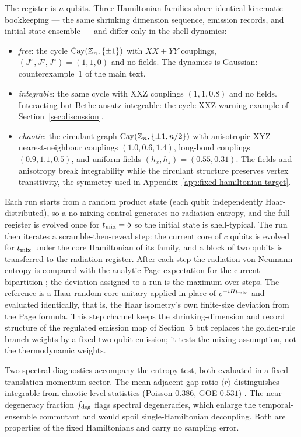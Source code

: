 \documentclass[12pt]{article}
\begin{document}
The register is $n$ qubits.  Three Hamiltonian families share identical
kinematic bookkeeping --- the same shrinking dimension sequence, emission
records, and initial-state ensemble --- and differ only in the shell
dynamics:
\begin{itemize}
\item
\emph{free}: the cycle ${\rm Cay}(\mathbb Z_n,\{\pm1\})$ with $XX+YY$
couplings, $(J^x,J^y,J^z)=(1,1,0)$ and no fields.  The dynamics is Gaussian:
counterexample~1 of the main text.
\item
\emph{integrable}: the same cycle with XXZ couplings $(1,1,0.8)$ and no
fields.  Interacting but Bethe-ansatz integrable: the cycle-XXZ warning
example of Section~\ref{sec:discussion}.
\item
\emph{chaotic}: the circulant graph ${\rm Cay}(\mathbb Z_n,\{\pm1,n/2\})$
with anisotropic XYZ nearest-neighbour couplings $(1.0,0.6,1.4)$, long-bond
couplings $(0.9,1.1,0.5)$, and uniform fields $(h_x,h_z)=(0.55,0.31)$.  The
fields and anisotropy break integrability while the circulant structure
preserves vertex transitivity, the symmetry used in
Appendix~\ref{app:fixed-hamiltonian-target}.
\end{itemize}
Each run starts from a random product state (each qubit independently
Haar-distributed), so a no-mixing control generates no radiation entropy, and
the full register is evolved once for $t_{\rm mix}=5$ so the initial state is
shell-typical.  The run then iterates a scramble-then-reveal step: the current
core of $c$ qubits is evolved for $t_{\rm mix}$ under the core Hamiltonian of
its family, and a block of two qubits is transferred to the radiation
register.  After each step the radiation von Neumann entropy is compared with
the analytic Page expectation for the current bipartition
\cite{Page1993Average}; the deviation assigned to a run is the maximum over
steps.  The reference is a Haar-random core unitary applied in place of
$e^{-iHt_{\rm mix}}$ and evaluated identically, that is, the Haar isometry's
own finite-size deviation from the Page formula.  This step channel keeps the
shrinking-dimension and record structure of the regulated emission map of
Section~5 but replaces the golden-rule branch weights by a fixed two-qubit
emission; it tests the mixing assumption, not the thermodynamic weights.

Two spectral diagnostics accompany the entropy test, both evaluated in a
fixed translation-momentum sector.  The mean adjacent-gap ratio
$\langle r\rangle$ distinguishes integrable from chaotic level statistics
(Poisson $0.386$, GOE $0.531$) \cite{OganesyanHuse2007,
AtasBogomolnyGiraudRoux2013}.  The near-degeneracy fraction
$f_{\rm deg}$ flags spectral degeneracies, which enlarge the temporal-ensemble
commutant and would spoil single-Hamiltonian decoupling.  Both are properties
of the fixed Hamiltonians and carry no sampling error.
\end{document}
